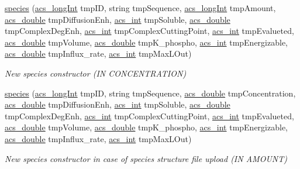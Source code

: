 \begin{DoxyCompactItemize}
\hyperlink{a00021_a2c407091ff53f0d508b7b9ed8230eee4}{species} (\hyperlink{a00050_a19319d75f02db4308bc5c0026d98cd85}{acs\+\_\+long\+Int} tmp\+I\+D, string tmp\+Sequence, \hyperlink{a00050_a19319d75f02db4308bc5c0026d98cd85}{acs\+\_\+long\+Int} tmp\+Amount, \hyperlink{a00050_ab776853a005fcbf56af0424a2a4dd607}{acs\+\_\+double} tmp\+Diffusion\+Enh, \hyperlink{a00050_a8d277355641a098190360234e2ebde35}{acs\+\_\+int} tmp\+Soluble, \hyperlink{a00050_ab776853a005fcbf56af0424a2a4dd607}{acs\+\_\+double} tmp\+Complex\+Deg\+Enh, \hyperlink{a00050_a8d277355641a098190360234e2ebde35}{acs\+\_\+int} tmp\+Complex\+Cutting\+Point, \hyperlink{a00050_a8d277355641a098190360234e2ebde35}{acs\+\_\+int} tmp\+Evalueted, \hyperlink{a00050_ab776853a005fcbf56af0424a2a4dd607}{acs\+\_\+double} tmp\+Volume, \hyperlink{a00050_ab776853a005fcbf56af0424a2a4dd607}{acs\+\_\+double} tmp\+K\+\_\+phospho, \hyperlink{a00050_a8d277355641a098190360234e2ebde35}{acs\+\_\+int} tmp\+Energizable, \hyperlink{a00050_ab776853a005fcbf56af0424a2a4dd607}{acs\+\_\+double} tmp\+Influx\+\_\+rate, \hyperlink{a00050_a8d277355641a098190360234e2ebde35}{acs\+\_\+int} tmp\+Max\+L\+Out)
\begin{DoxyCompactList}\small\item\em New species constructor (I\+N C\+O\+N\+C\+E\+N\+T\+R\+A\+T\+I\+O\+N) \end{DoxyCompactList}\item 
\hyperlink{a00021_a0c91a8b735cb484bff240ba5049f6af3}{species} (\hyperlink{a00050_a19319d75f02db4308bc5c0026d98cd85}{acs\+\_\+long\+Int} tmp\+I\+D, string tmp\+Sequence, \hyperlink{a00050_ab776853a005fcbf56af0424a2a4dd607}{acs\+\_\+double} tmp\+Concentration, \hyperlink{a00050_ab776853a005fcbf56af0424a2a4dd607}{acs\+\_\+double} tmp\+Diffusion\+Enh, \hyperlink{a00050_a8d277355641a098190360234e2ebde35}{acs\+\_\+int} tmp\+Soluble, \hyperlink{a00050_ab776853a005fcbf56af0424a2a4dd607}{acs\+\_\+double} tmp\+Complex\+Deg\+Enh, \hyperlink{a00050_a8d277355641a098190360234e2ebde35}{acs\+\_\+int} tmp\+Complex\+Cutting\+Point, \hyperlink{a00050_a8d277355641a098190360234e2ebde35}{acs\+\_\+int} tmp\+Evalueted, \hyperlink{a00050_ab776853a005fcbf56af0424a2a4dd607}{acs\+\_\+double} tmp\+Volume, \hyperlink{a00050_ab776853a005fcbf56af0424a2a4dd607}{acs\+\_\+double} tmp\+K\+\_\+phospho, \hyperlink{a00050_a8d277355641a098190360234e2ebde35}{acs\+\_\+int} tmp\+Energizable, \hyperlink{a00050_ab776853a005fcbf56af0424a2a4dd607}{acs\+\_\+double} tmp\+Influx\+\_\+rate, \hyperlink{a00050_a8d277355641a098190360234e2ebde35}{acs\+\_\+int} tmp\+Max\+L\+Out)
\begin{DoxyCompactList}\small\item\em New species constructor in case of species structure file upload (I\+N A\+M\+O\+U\+N\+T) \end{DoxyCompactList}\item 

\end{DoxyCompactItemize}
